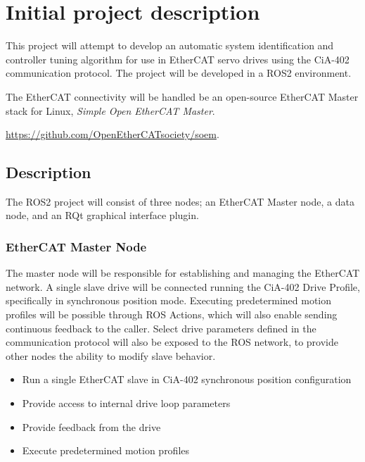 \newcommand\pdescitemsep{-0.2em}
\section{Initial project description}

This project will attempt to develop an automatic system identification and controller tuning algorithm for use in EtherCAT servo drives using the CiA-402 communication protocol.
The project will be developed in a ROS2 environment. 
 
The EtherCAT connectivity will be handled be an open-source EtherCAT Master stack for Linux, \textit{Simple Open EtherCAT Master}.

\href{https://github.com/OpenEtherCATsociety/soem}{https://github.com/OpenEtherCATsociety/soem}. 

\subsection{Description}

\noindent
The ROS2 project will consist of three nodes; an EtherCAT Master node, a data node, and an RQt graphical interface plugin. 


\subsubsection{EtherCAT Master Node}

The master node will be responsible for establishing and managing the EtherCAT network.
A single slave drive will be connected running the CiA-402 Drive Profile, specifically in synchronous position mode.
Executing predetermined motion profiles will be possible through ROS Actions, which will also enable sending continuous feedback to the caller. 
Select drive parameters defined in the communication protocol will also be exposed to the ROS network, to provide other nodes the ability to modify slave behavior. 

\begin{itemize}
	\setlength\itemsep{\pdescitemsep}
	\item Run a single EtherCAT slave in CiA-402 synchronous position configuration
	\item Provide access to internal drive loop parameters
	\item Provide feedback from the drive
	\item Execute predetermined motion profiles
\end{itemize}

